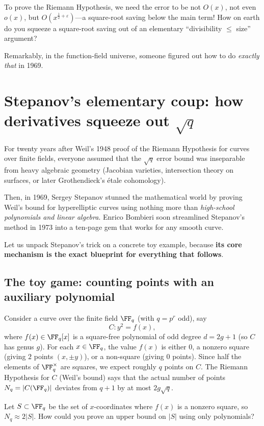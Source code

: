To prove the Riemann Hypothesis, we need the error to be not \(O(x)\), not even \(o(x)\), but \(O(x^{\frac{1}{2}+\varepsilon})\)---a square-root saving below the main term! How on earth do you squeeze a square-root saving out of an elementary ``divisibility \(\le\) size'' argument?

Remarkably, in the function-field universe, someone figured out how to do \emph{exactly that} in 1969.

\section{Stepanov's elementary coup: how derivatives squeeze out \(\sqrt{q}\)}

For twenty years after Weil's 1948 proof of the Riemann Hypothesis for curves over finite fields, everyone assumed that the \(\sqrt{q}\) error bound was inseparable from heavy algebraic geometry (Jacobian varieties, intersection theory on surfaces, or later Grothendieck's \'etale cohomology).

Then, in 1969, Sergey Stepanov stunned the mathematical world by proving Weil's bound for hyperelliptic curves using nothing more than \emph{high-school polynomials and linear algebra}. Enrico Bombieri soon streamlined Stepanov's method in 1973 into a ten-page gem that works for any smooth curve.

Let us unpack Stepanov's trick on a concrete toy example, because \textbf{its core mechanism is the exact blueprint for everything that follows}.

\subsection{The toy game: counting points with an auxiliary polynomial}

Consider a curve over the finite field \(\FF_q\) (with \(q = p^r\) odd), say
\[
  C : y^2 = f(x),
\]
where \(f(x) \in \FF_q[x]\) is a square-free polynomial of odd degree \(d = 2g + 1\) (so \(C\) has genus \(g\)). For each \(x \in \FF_q\), the value \(f(x)\) is either \(0\), a nonzero square (giving \(2\) points \((x,\pm y)\)), or a non-square (giving \(0\) points). Since half the elements of \(\FF_q^\times\) are squares, we expect roughly \(q\) points on \(C\). The Riemann Hypothesis for \(C\) (Weil's bound) says that the actual number of points \(N_q = |C(\FF_q)|\) deviates from \(q+1\) by at most \(2g\sqrt{q}\).

Let \(S \subset \FF_q\) be the set of \(x\)-coordinates where \(f(x)\) is a nonzero square, so \(N_q \approx 2|S|\). How could you prove an upper bound on \(|S|\) using only polynomials?

